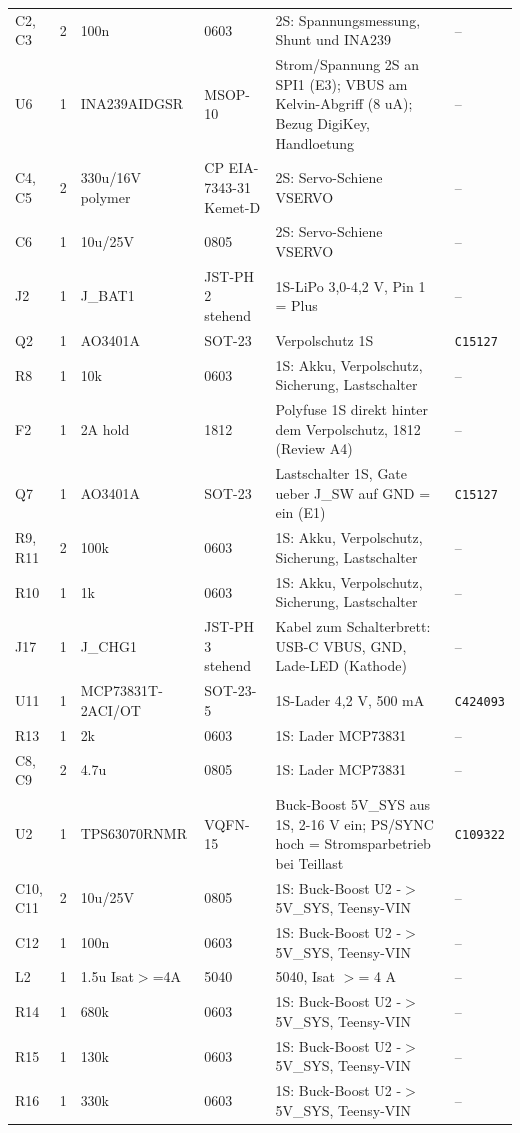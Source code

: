 \begin{longtable}{L{24mm} r L{26mm} L{30mm} L{52mm} L{14mm}}
C2, C3 & 2 & 100n & 0603 & 2S: Spannungsmessung, Shunt und INA239 & –\\
U6 & 1 & INA239AIDGSR & MSOP-10 & Strom/Spannung 2S an SPI1 (E3); VBUS am Kelvin-Abgriff (8 uA); Bezug DigiKey, Handloetung & –\\
C4, C5 & 2 & 330u/16V polymer & CP EIA-7343-31 Kemet-D & 2S: Servo-Schiene VSERVO & –\\
C6 & 1 & 10u/25V & 0805 & 2S: Servo-Schiene VSERVO & –\\
J2 & 1 & J\_BAT1 & JST-PH 2 stehend & 1S-LiPo 3,0-4,2 V, Pin 1 = Plus & –\\
Q2 & 1 & AO3401A & SOT-23 & Verpolschutz 1S & \texttt{C15127}\\
R8 & 1 & 10k & 0603 & 1S: Akku, Verpolschutz, Sicherung, Lastschalter & –\\
F2 & 1 & 2A hold & 1812 & Polyfuse 1S direkt hinter dem Verpolschutz, 1812 (Review A4) & –\\
Q7 & 1 & AO3401A & SOT-23 & Lastschalter 1S, Gate ueber J\_SW auf GND = ein (E1) & \texttt{C15127}\\
R9, R11 & 2 & 100k & 0603 & 1S: Akku, Verpolschutz, Sicherung, Lastschalter & –\\
R10 & 1 & 1k & 0603 & 1S: Akku, Verpolschutz, Sicherung, Lastschalter & –\\
J17 & 1 & J\_CHG1 & JST-PH 3 stehend & Kabel zum Schalterbrett: USB-C VBUS, GND, Lade-LED (Kathode) & –\\
U11 & 1 & MCP73831T-2ACI/OT & SOT-23-5 & 1S-Lader 4,2 V, 500 mA & \texttt{C424093}\\
R13 & 1 & 2k & 0603 & 1S: Lader MCP73831 & –\\
C8, C9 & 2 & 4.7u & 0805 & 1S: Lader MCP73831 & –\\
U2 & 1 & TPS63070RNMR & VQFN-15 & Buck-Boost 5V\_SYS aus 1S, 2-16 V ein; PS/SYNC hoch = Stromsparbetrieb bei Teillast & \texttt{C109322}\\
C10, C11 & 2 & 10u/25V & 0805 & 1S: Buck-Boost U2 -$>$ 5V\_SYS, Teensy-VIN & –\\
C12 & 1 & 100n & 0603 & 1S: Buck-Boost U2 -$>$ 5V\_SYS, Teensy-VIN & –\\
L2 & 1 & 1.5u Isat$>$=4A & 5040 & 5040, Isat $>$= 4 A & –\\
R14 & 1 & 680k & 0603 & 1S: Buck-Boost U2 -$>$ 5V\_SYS, Teensy-VIN & –\\
R15 & 1 & 130k & 0603 & 1S: Buck-Boost U2 -$>$ 5V\_SYS, Teensy-VIN & –\\
R16 & 1 & 330k & 0603 & 1S: Buck-Boost U2 -$>$ 5V\_SYS, Teensy-VIN & –\\

\end{longtable}
